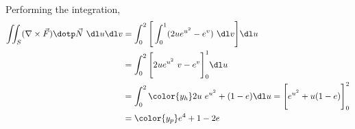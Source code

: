 \begin{enumerate}
\begin{align}
          \end{align}
          Performing the integration,
          \begin{align}
              \iint_S (\nabla \times \vec{F}) \dotp \vec{N}\ \dl u \dl v
               & = \int_{0}^{2} \Bigg[ \int_{0}^{1} (2ue^{u^2} - e^v)
              \ \dl v \Bigg] \dl u                                         \\
               & = \int_{0}^{2} \Bigg[ 2ue^{u^2}\ v - e^v \Bigg]_0^1 \dl u \\
               & = \int_{0}^{2} {\color{y_h}2u\ e^{u^2} + (1 - e)} \dl u
              =  \Bigg[ e^{u^2} + u(1 - e) \Bigg]_0^2                      \\
               & = \color{y_p} e^4 + 1 - 2e
          \end{align}


\end{enumerate}
